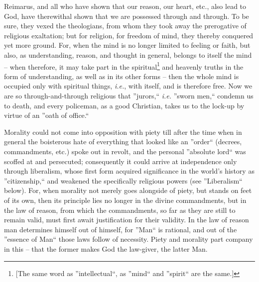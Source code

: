 \documentclass[12pt,a4paper]{book}
\begin{document}
Reimarus, and all who have shown that our reason, our heart, etc., also lead 
to God, have therewithal shown that we are possessed through and through. To 
be sure, they vexed the theologians, from whom they took away the prerogative 
of religious exaltation; but for religion, for freedom of mind, they thereby 
conquered yet more ground. For, when the mind is no longer limited to feeling 
or faith, but also, as understanding, reason, and thought in general, belongs 
to itself the mind -- when therefore, it may take part in the 
spiritual\footnote{[The same word as ''intellectual``, as ''mind`` and 
''spirit`` are the same.]} and heavenly truths in the form of understanding, 
as well as in its other forms -- then the whole mind is occupied only with 
spiritual things, \textit{i.e.}, with itself, and is therefore free. Now we 
are so through-and-through religious that ''jurors,`` \textit{i.e.} ''sworn 
men,`` condemn us to death, and every policeman, as a good Christian, takes 
us to the lock-up by virtue of an ''oath of office.``

Morality could not come into opposition with piety till after the time when in 
general the boisterous hate of everything that looked like an ''order`` 
(decrees, commandments, etc.) spoke out in revolt, and the personal 
''absolute lord`` was scoffed at and persecuted; consequently it could 
arrive at independence only through liberalism, whose first form acquired 
significance in the world's history as ''citizenship,`` and weakened the 
specifically religious powers (see ''Liberalism`` below). For, when morality 
not merely goes alongside of piety, but stands on feet of its own, then its 
principle lies no longer in the divine commandments, but in the law of reason, 
from which the commandments, so far as they are still to remain valid, must 
first await justification for their validity. In the law of reason man 
determines himself out of himself, for ''Man`` is rational, and out of the 
''essence of Man`` those laws follow of necessity. Piety and morality part 
company in this -- that the former makes God the law-giver, the latter Man.
\end{document}
